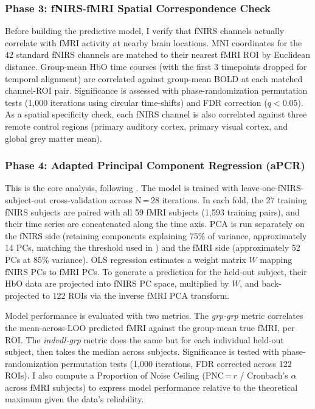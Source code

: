 \subsubsection{Phase 3: fNIRS-fMRI Spatial Correspondence Check}

Before building the predictive model, I verify that fNIRS channels actually correlate with fMRI activity at nearby brain locations. MNI coordinates for the 42 standard fNIRS channels are matched to their nearest fMRI ROI by Euclidean distance. Group-mean HbO time courses (with the first 3 timepoints dropped for temporal alignment) are correlated against group-mean BOLD at each matched channel-ROI pair. Significance is assessed with phase-randomization permutation tests (1,000 iterations using circular time-shifts) and FDR correction ($q < 0.05$). As a spatial specificity check, each fNIRS channel is also correlated against three remote control regions (primary auditory cortex, primary visual cortex, and global grey matter mean).

\subsubsection{Phase 4: Adapted Principal Component Regression (aPCR)}

This is the core analysis, following \citet{gao2025}. The model is trained with leave-one-fNIRS-subject-out cross-validation across N\,=\,28 iterations. In each fold, the 27 training fNIRS subjects are paired with all 59 fMRI subjects (1,593 training pairs), and their time series are concatenated along the time axis. PCA is run separately on the fNIRS side (retaining components explaining 75\% of variance, approximately 14 PCs, matching the threshold used in \citet{gao2025}) and the fMRI side (approximately 52 PCs at 85\% variance). OLS regression estimates a weight matrix $W$ mapping fNIRS PCs to fMRI PCs. To generate a prediction for the held-out subject, their HbO data are projected into fNIRS PC space, multiplied by $W$, and back-projected to 122 ROIs via the inverse fMRI PCA transform.

Model performance is evaluated with two metrics. The \textit{grp-grp} metric correlates the mean-across-LOO predicted fMRI against the group-mean true fMRI, per ROI. The \textit{indvdl-grp} metric does the same but for each individual held-out subject, then takes the median across subjects. Significance is tested with phase-randomization permutation tests (1,000 iterations, FDR corrected across 122 ROIs). I also compute a Proportion of Noise Ceiling (PNC\,=\,$r$ / Cronbach's $\alpha$ across fMRI subjects) to express model performance relative to the theoretical maximum given the data's reliability.

